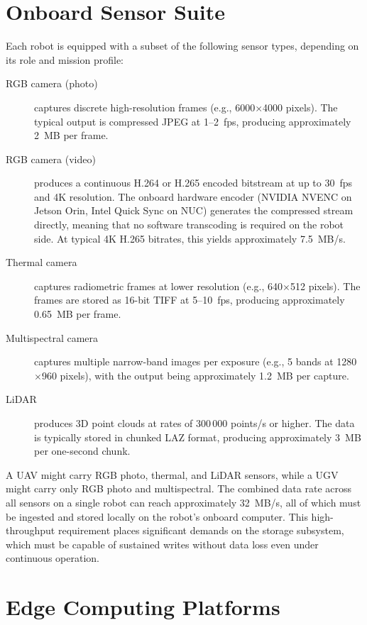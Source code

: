 \section{Onboard Sensor Suite} \label{sec:sensor-suite}

Each robot is equipped with a subset of the following sensor types, depending on its role and mission profile:

\begin{description}
    \item[RGB camera (photo)] captures discrete high-resolution frames (e.g., 6000$\times$4000 pixels). The typical output is compressed JPEG at 1--2~fps, producing approximately 2~MB per frame.
    \item[RGB camera (video)] produces a continuous H.264 or H.265 encoded bitstream at up to 30~fps and 4K resolution. The onboard hardware encoder (NVIDIA NVENC on Jetson Orin, Intel Quick Sync on NUC) generates the compressed stream directly, meaning that no software transcoding is required on the robot side. At typical 4K H.265 bitrates, this yields approximately 7.5~MB/s.
    \item[Thermal camera] captures radiometric frames at lower resolution (e.g., 640$\times$512 pixels). The frames are stored as 16-bit TIFF at 5--10~fps, producing approximately 0.65~MB per frame.
    \item[Multispectral camera] captures multiple narrow-band images per exposure (e.g., 5 bands at 1280$\times$960 pixels), with the output being approximately 1.2~MB per capture.
    \item[LiDAR] produces 3D point clouds at rates of 300\,000 points/s or higher. The data is typically stored in chunked LAZ format, producing approximately 3~MB per one-second chunk.
\end{description}

A UAV might carry RGB photo, thermal, and LiDAR sensors, while a UGV might carry only RGB photo and multispectral. The combined data rate across all sensors on a single robot can reach approximately 32~MB/s, all of which must be ingested and stored locally on the robot's onboard computer. This high-throughput requirement places significant demands on the storage subsystem, which must be capable of sustained writes without data loss even under continuous operation.

\section{Edge Computing Platforms} \label{sec:edge-platforms}

